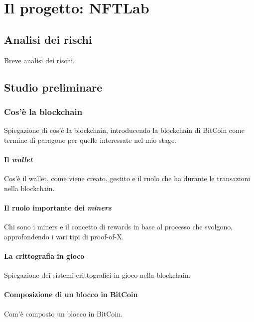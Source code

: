 
\chapter{Il progetto: NFTLab}
\label{cap:nftlab}


\section{Analisi dei rischi}
Breve analisi dei rischi.

\section{Studio preliminare}

\subsection{Cos'è la blockchain}
Spiegazione di cos'è la blockchain, introducendo la blockchain di BitCoin come termine di paragone per quelle interessate nel mio stage.

\subsubsection{Il \textit{wallet}}
Cos'è il wallet, come viene creato, gestito e il ruolo che ha durante le transazioni nella blockchain.

\subsubsection{Il ruolo importante dei \textit{miners}}
Chi sono i miners e il concetto di rewards in base al processo che svolgono, approfondendo i vari tipi di proof-of-X.

\subsubsection{La crittografia in gioco}
Spiegazione dei sistemi crittografici in gioco nella blockchain.

\subsubsection{Composizione di un blocco in BitCoin}
Com'è composto un blocco in BitCoin.

